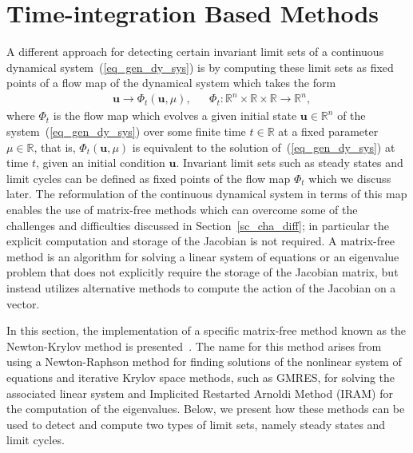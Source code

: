 \section{Time-integration Based Methods}\label{sc_ti_ap}
A different approach for detecting certain invariant limit sets of a continuous dynamical system~(\ref{eq_gen_dy_sys}) is by computing these limit sets as fixed points of a flow map of the dynamical system which takes the form
\begin{align}
\label{flow_map}
&\mathbf{u}\rightarrow \Phi_t(\mathbf{u},\mu),
& &\Phi_t: \mathbb{R}^n\times\mathbb{R}\times\mathbb{R}\rightarrow\mathbb{R}^n,
\end{align}
where $\Phi_t$ is the flow map which evolves a given initial state $\mathbf{u} \in \mathbb{R}^n$ of the system~(\ref{eq_gen_dy_sys}) over some finite time $t \in \mathbb{R}$  at a fixed parameter $\mu \in \mathbb{R}$, that is, $\Phi_t(\mathbf{u},\mu)$ is equivalent to the solution of~(\ref{eq_gen_dy_sys}) at time $t$, given an initial condition $\mathbf{u}$.
Invariant limit sets such as steady states and limit cycles can be defined as fixed points of the flow map $\Phi_t$ which we discuss later. The reformulation of the continuous dynamical system in terms of this map enables the use of matrix-free methods which can overcome some of the challenges and difficulties discussed in Section~\ref{sc_cha_diff}; in particular the explicit computation and storage of the Jacobian is not required. A matrix-free method is an algorithm for solving a linear system of equations or an eigenvalue problem that does not explicitly require the storage of the Jacobian matrix, but instead utilizes alternative methods to compute the action of the Jacobian on a vector.

In this section, the implementation of a specific matrix-free method known as the Newton-Krylov method is presented~\cite{Sanchez200413}. The name for this method arises from using a Newton-Raphson method for finding solutions of the nonlinear system of equations and iterative Krylov space methods, such as GMRES, for solving the associated linear system and Implicited Restarted Arnoldi Method (IRAM) for the computation of the eigenvalues. Below, we present how these methods can be used to detect and compute two types of limit sets, namely steady states and limit cycles.

